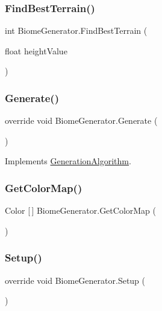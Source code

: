 \subsubsection{\texorpdfstring{Find\+Best\+Terrain()}{FindBestTerrain()}}
{\footnotesize\ttfamily int Biome\+Generator.\+Find\+Best\+Terrain (\begin{DoxyParamCaption}\item[{float}]{height\+Value }\end{DoxyParamCaption})}

\mbox{\label{class_biome_generator_ac8ac31b6e0276662994f0cd143457fdb}} 
\subsubsection{\texorpdfstring{Generate()}{Generate()}}
{\footnotesize\ttfamily override void Biome\+Generator.\+Generate (\begin{DoxyParamCaption}{ }\end{DoxyParamCaption})\hspace{0.3cm}{\ttfamily [virtual]}}



Implements \mbox{\hyperlink{class_generation_algorithm_ac2df20f7751c1b480ab958791d5c7d41}{Generation\+Algorithm}}.

\mbox{\label{class_biome_generator_ad1c3b877b0dde5621250e5ca3c78446a}} 
\subsubsection{\texorpdfstring{Get\+Color\+Map()}{GetColorMap()}}
{\footnotesize\ttfamily Color \mbox{[}$\,$\mbox{]} Biome\+Generator.\+Get\+Color\+Map (\begin{DoxyParamCaption}{ }\end{DoxyParamCaption})}

\mbox{\label{class_biome_generator_aa1df38909c58ff7112ebfd285e65f6c0}} 
\subsubsection{\texorpdfstring{Setup()}{Setup()}}
{\footnotesize\ttfamily override void Biome\+Generator.\+Setup (\begin{DoxyParamCaption}{ }\end{DoxyParamCaption})\hspace{0.3cm}{\ttfamily [virtual]}}



